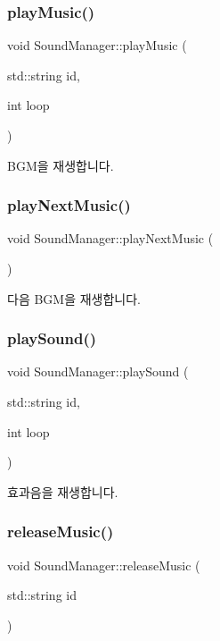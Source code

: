 \subsubsection{\texorpdfstring{playMusic()}{playMusic()}}
{\footnotesize\ttfamily void Sound\+Manager\+::play\+Music (\begin{DoxyParamCaption}\item[{std\+::string}]{id,  }\item[{int}]{loop }\end{DoxyParamCaption})}

B\+G\+M을 재생합니다. \mbox{\label{class_sound_manager_a67eb6b3c3e83c2163326e01a6816ddbc}} 
\subsubsection{\texorpdfstring{playNextMusic()}{playNextMusic()}}
{\footnotesize\ttfamily void Sound\+Manager\+::play\+Next\+Music (\begin{DoxyParamCaption}{ }\end{DoxyParamCaption})}

다음 B\+G\+M을 재생합니다. \mbox{\label{class_sound_manager_a44a5bc613545fc32b876f0a8c48ba542}} 
\subsubsection{\texorpdfstring{playSound()}{playSound()}}
{\footnotesize\ttfamily void Sound\+Manager\+::play\+Sound (\begin{DoxyParamCaption}\item[{std\+::string}]{id,  }\item[{int}]{loop }\end{DoxyParamCaption})}

효과음을 재생합니다. \mbox{\label{class_sound_manager_a527f8e242586e8f5f1fb404a74e6a91e}} 
\subsubsection{\texorpdfstring{releaseMusic()}{releaseMusic()}}
{\footnotesize\ttfamily void Sound\+Manager\+::release\+Music (\begin{DoxyParamCaption}\item[{std\+::string}]{id }\end{DoxyParamCaption})}

